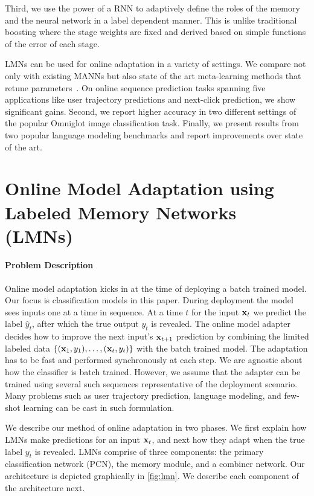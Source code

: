 \documentclass[letterpaper]{article} %
\newcommand{\vek}[1]{{\bf {#1}}}
\newcommand{\vx}{{\vek{x}}}
\begin{document}
Third, we use the power of a RNN to adaptively define the roles of the memory and the neural network in a label dependent manner.  This is unlike traditional boosting where the stage weights are fixed and derived based on simple functions of the error of each stage.

LMNs can be used for online adaptation in a variety of settings.  We compare not only with existing MANNs but also state of the art meta-learning methods that retune parameters~\cite{Rei15,Finn2017ModelAgnosticMF}.
On online sequence prediction tasks spanning five applications like user trajectory predictions and next-click prediction,  we show significant gains.
Second, we report higher accuracy in two different settings of the popular Omniglot image classification task. Finally, we present results from two popular language modeling benchmarks and report improvements over state of the art.







\section{Online Model Adaptation using Labeled Memory Networks (LMNs)}
\label{sec-online}
\paragraph{Problem Description}
Online model adaptation kicks in at the time of deploying a batch trained model. Our focus is classification models in this paper.  During deployment the model sees inputs one at a time in sequence.  At a time $t$ for the input $\vx_t$ we predict the label  $\hat{y}_t$,  after which the true output $y_t$ is revealed.  The online model adapter decides how to improve the next input's $\vx_{t+1}$ prediction by combining the limited labeled data $\{(\vx_1,y_1),\ldots,(\vx_t,y_t)\}$ with the batch trained model.  The adaptation has to be fast and performed synchronously at each step.  We are agnostic about how the classifier is batch trained. However, we assume that the adapter can be trained using several such sequences representative of the deployment scenario.
Many problems such as user trajectory prediction, language modeling, and few-shot learning can be cast in such formulation.



We describe our method of online adaptation in two phases.  We first explain how LMNs make predictions for an input $\vx_t$, and next how they adapt when the true label $y_t$ is revealed.  LMNs comprise of three components: the primary classification network (PCN), the memory module, and a combiner network. Our architecture is depicted graphically in \ref{fig:lmn}. We describe each component of the architecture next.
\end{document}
